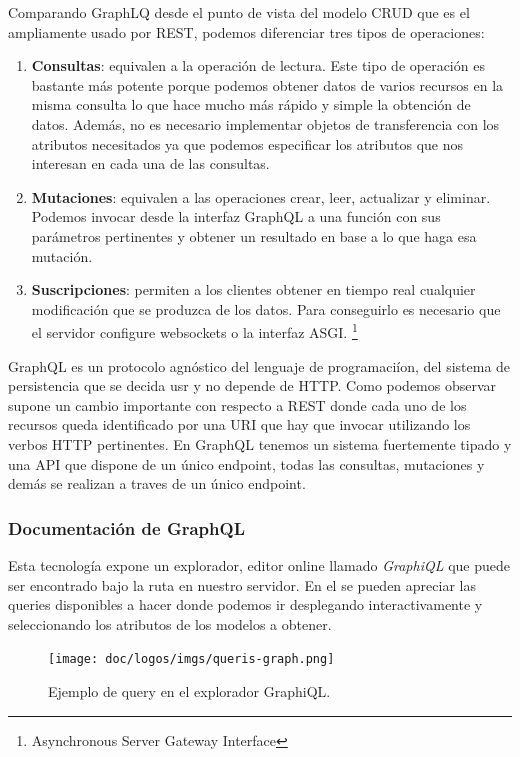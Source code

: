 Comparando GraphLQ desde el punto de vista del modelo CRUD que es el ampliamente usado por
REST, podemos diferenciar tres tipos de operaciones:
\begin{enumerate}
    \item \textbf{Consultas}: equivalen a la operación de lectura. Este tipo de operación
    es bastante más potente porque podemos obtener datos de varios recursos en la misma
    consulta lo que hace mucho más rápido y simple la obtención de datos. Además, no es
    necesario implementar objetos de transferencia con los atributos necesitados ya que
    podemos especificar los atributos que nos interesan en cada una de las consultas.
    \item \textbf{Mutaciones}: equivalen a las operaciones crear, leer, actualizar y
    eliminar. Podemos invocar desde la interfaz GraphQL a una función con sus parámetros
    pertinentes y obtener un resultado en base a lo que haga esa mutación.
    \item \textbf{Suscripciones}: permiten a los clientes obtener en tiempo real cualquier
    modificación que se produzca de los datos. Para conseguirlo es necesario que el
    servidor configure websockets o la interfaz ASGI. \footnote{Asynchronous Server
    Gateway Interface}
\end{enumerate}

GraphQL es un protocolo agnóstico del lenguaje de programaciíon, del sistema de
persistencia que se decida usr y no depende de HTTP. Como podemos observar supone un
cambio importante con respecto a REST donde cada uno de los recursos queda identificado
por una URI que hay que invocar utilizando los verbos HTTP pertinentes. En GraphQL tenemos
un sistema fuertemente tipado y una API que dispone de un único endpoint, todas las
consultas, mutaciones y demás se realizan a traves de un único endpoint.

\subsubsection{Documentación de GraphQL}
Esta tecnología expone un explorador, editor online llamado \textit{GraphiQL} que puede
ser encontrado bajo la ruta  en nuestro servidor. En el se pueden
apreciar las queries disponibles a hacer donde podemos ir desplegando interactivamente y
seleccionando los atributos de los modelos a obtener.

\FloatBarrier
\begin{figure}[h]
	\centering	
	\texttt{[image: doc/logos/imgs/queris-graph.png]}
	\caption{ Ejemplo de query en el explorador GraphiQL. }
    \label{fig:graficos-GraphiQL}
\end{figure}
\FloatBarrier

